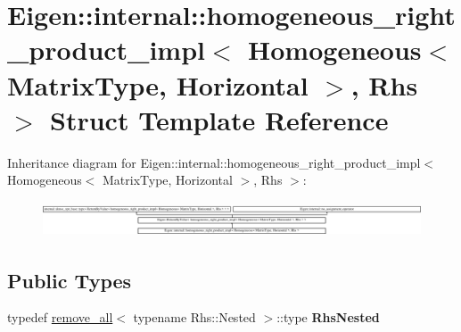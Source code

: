 \hypertarget{struct_eigen_1_1internal_1_1homogeneous__right__product__impl_3_01_homogeneous_3_01_matrix_type_ef182dac64ca84d6bf223cfad456dbfc}{}\section{Eigen\+::internal\+::homogeneous\+\_\+right\+\_\+product\+\_\+impl$<$ Homogeneous$<$ Matrix\+Type, Horizontal $>$, Rhs $>$ Struct Template Reference}
\label{struct_eigen_1_1internal_1_1homogeneous__right__product__impl_3_01_homogeneous_3_01_matrix_type_ef182dac64ca84d6bf223cfad456dbfc}
Inheritance diagram for Eigen\+::internal\+::homogeneous\+\_\+right\+\_\+product\+\_\+impl$<$ Homogeneous$<$ Matrix\+Type, Horizontal $>$, Rhs $>$\+:\begin{figure}[H]
\begin{center}
\leavevmode
\includegraphics[height=1.050000cm]{struct_eigen_1_1internal_1_1homogeneous__right__product__impl_3_01_homogeneous_3_01_matrix_type_ef182dac64ca84d6bf223cfad456dbfc}
\end{center}
\end{figure}
\subsection*{Public Types}
\begin{DoxyCompactItemize}
\item 
\mbox{\label{struct_eigen_1_1internal_1_1homogeneous__right__product__impl_3_01_homogeneous_3_01_matrix_type_ef182dac64ca84d6bf223cfad456dbfc_acc95ace7a9e4099584f34079c3de462a}} 
typedef \mbox{\hyperlink{struct_eigen_1_1internal_1_1remove__all}{remove\+\_\+all}}$<$ typename Rhs\+::\+Nested $>$\+::type {\bfseries Rhs\+Nested}
\end{DoxyCompactItemize}
